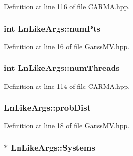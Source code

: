 Definition at line 116 of file C\-A\-R\-M\-A.\-hpp.

\hypertarget{struct_ln_like_args_a14cedd7e2fed9d152ce3de6383567dad}{
\subsubsection[{num\-Pts}]{\setlength{\rightskip}{0pt plus 5cm}int Ln\-Like\-Args\-::num\-Pts}}\label{struct_ln_like_args_a14cedd7e2fed9d152ce3de6383567dad}


Definition at line 16 of file Gauss\-M\-V.\-hpp.

\hypertarget{struct_ln_like_args_ad84da20749d9935f6a5a04b5c56d729a}{
\subsubsection[{num\-Threads}]{\setlength{\rightskip}{0pt plus 5cm}int Ln\-Like\-Args\-::num\-Threads}}\label{struct_ln_like_args_ad84da20749d9935f6a5a04b5c56d729a}


Definition at line 114 of file C\-A\-R\-M\-A.\-hpp.

\hypertarget{struct_ln_like_args_ad8d1ee1e21bab664c116720df98cf287}{
\subsubsection[{prob\-Dist}]{ Ln\-Like\-Args\-::prob\-Dist}}\label{struct_ln_like_args_ad8d1ee1e21bab664c116720df98cf287}


Definition at line 18 of file Gauss\-M\-V.\-hpp.

\hypertarget{struct_ln_like_args_af605bb6dcb409ad41dfc1a00c1e12c3f}{
\subsubsection[{Systems}]{$\ast$ Ln\-Like\-Args\-::\-Systems}}\label{struct_ln_like_args_af605bb6dcb409ad41dfc1a00c1e12c3f}


